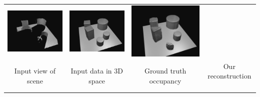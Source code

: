 \begin{tabular}{cccc}
\includegraphics[height=\turnheight]{kmrkmma8u2456lgk_SEQ_visible.png} &
\includegraphics[height=\turnheight]{kmrkmma8u2456lgk_SEQ_gt.png} &
\includegraphics[height=\turnheight]{kmrkmma8u2456lgk_SEQ_pred_voxlets.png} \\
\footnotesize Input view of scene &
\footnotesize Input data in 3D space &
\footnotesize Ground truth occupancy &
\footnotesize Our reconstruction \
\end{tabular}